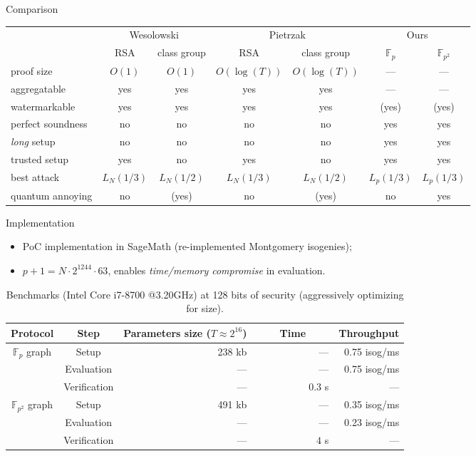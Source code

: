 \documentclass[aspectratio=169]{beamer}
\newcommand{\F}{\mathbb{F}}
\begin{document}
\begin{frame}{Comparison}
  \begin{tabular}{l | c c | c c | c c}
    & \multicolumn{2}{c|}{Wesolowski} & \multicolumn{2}{c|}{Pietrzak} & \multicolumn{2}{c}{Ours}\\
    & RSA & class group & RSA & class group & $\F_p$ & $\F_{p^2}$\\
    \hline
    proof size    & $O(1)$ & $O(1)$ & $O(\log(T))$ & $O(\log(T))$ & --- & ---\\
    aggregatable  & yes & yes & yes & yes & --- & ---\\
    watermarkable & yes & yes & yes & yes & (yes) & (yes)\\
    perfect soundness & no & no & no & no & yes & yes\\
    \textit{long} setup & no & no & no & no & \alert{yes} & \alert{yes}\\
    trusted setup & \alert{yes} & no & \alert{yes} & no & \alert{yes} & \alert{yes}\\
    best attack   & $L_N(1/3)$ & $L_N(1/2)$ & $L_N(1/3)$ & $L_N(1/2)$ & $L_p(1/3)$ & $L_p(1/3)$\\
    quantum annoying & no & (yes) & no & (yes) & no & yes\\
  \end{tabular}
\end{frame}


\begin{frame}{Implementation}
  \begin{itemize}
  \item PoC implementation in SageMath (re-implemented Montgomery isogenies);
  \item \emph{$p+1 = N\cdot 2^{1244}\cdot 63$}, enables
    \emph{time/memory compromise} in evaluation.
  \end{itemize}

  \bigskip
  \begin{table}
    \centering
    \begin{tabular}{c c r r r}
      \textbf{Protocol} & \textbf{Step} & \textbf{Parameters size} ($T\approx 2^{16}$)
      & ~~~~\textbf{Time}~~~~ & \textbf{Throughput}	\\
      \hline
      \multirow{3}{*}{$\F_p$ graph} & Setup & 238 kb & --- & 0.75 isog/ms\\
      & Evaluation & --- &  --- & 0.75 isog/ms\\
      & Verification & --- & $0.3$ s & ---\\
      \hline
      \multirow{3}{*}{$\F_{p^2}$ graph} & Setup & 491 kb & --- & 0.35 isog/ms\\
      & Evaluation & --- &  --- & 0.23 isog/ms\\
      & Verification & --- & $4$ s & ---\\
    \end{tabular}
    
    \caption{Benchmarks (Intel Core i7-8700 @3.20GHz) at 128 bits of
      security (aggressively optimizing for size).}
  \end{table}
\end{frame}
\end{document}
